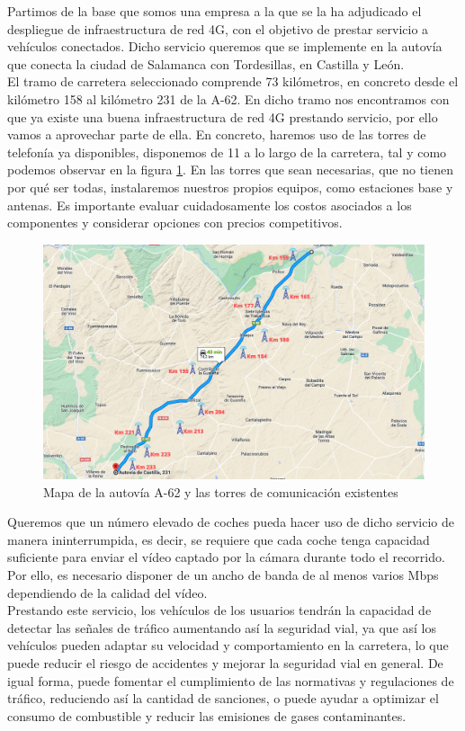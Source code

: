 Partimos de la base que somos una empresa a la que se la ha adjudicado el despliegue de infraestructura de red 4G, con el objetivo de prestar servicio a vehículos conectados. Dicho servicio queremos que se implemente en la autovía que conecta la ciudad de Salamanca con Tordesillas, en Castilla y León. \\

El tramo de carretera seleccionado comprende 73 kilómetros, en concreto desde el kilómetro 158 al kilómetro 231 de la A-62. En dicho tramo nos encontramos con que ya existe una buena infraestructura de red 4G prestando servicio, por ello vamos a aprovechar parte de ella. En concreto, haremos uso de las torres de telefonía ya disponibles, disponemos de 11 a lo largo de la carretera, tal y como podemos observar en la figura \ref{autovia}. En las torres que sean necesarias, que no tienen por qué ser todas, instalaremos nuestros propios equipos, como estaciones base y antenas. Es importante evaluar cuidadosamente los costos asociados a los componentes y considerar opciones con precios competitivos. \\


\begin{figure}[H]
    \centering
 	\includegraphics[width=\textwidth]{Imagenes/PlanteamientoInicial/torres_telefonia.pdf}
    \caption{Mapa de la autovía A-62 y las torres de comunicación existentes }
    \label{autovia}
\end{figure}

Queremos que un número elevado de coches pueda hacer uso de dicho servicio de manera ininterrumpida, es decir, se requiere que cada coche tenga capacidad suficiente para enviar el vídeo captado por la cámara durante todo el recorrido. Por ello, es necesario disponer de un ancho de banda de al menos varios Mbps dependiendo de la calidad del vídeo. \\

Prestando este servicio, los vehículos de los usuarios tendrán la capacidad de detectar las señales de tráfico aumentando así la seguridad vial, ya que así los vehículos pueden adaptar su velocidad y comportamiento en la carretera, lo que puede reducir el riesgo de accidentes y mejorar la seguridad vial en general. De igual forma, puede fomentar el cumplimiento de las normativas y regulaciones de tráfico, reduciendo así la cantidad de sanciones, o puede ayudar a optimizar el consumo de combustible y reducir las emisiones de gases contaminantes.\\
